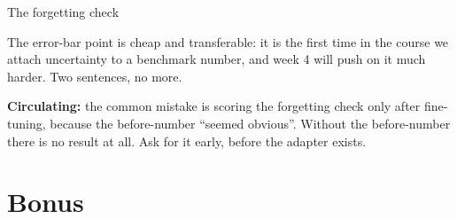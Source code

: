 \documentclass[aspectratio=169,10pt]{beamer}
\begin{document}
\begin{frame}[shrink=11]{The forgetting check}
{  The error-bar point is cheap and transferable: it is the first time in the
  course we attach uncertainty to a benchmark number, and week 4 will push on it
  much harder. Two sentences, no more.

  \textbf{Circulating:} the common mistake is scoring the forgetting check only
  after fine-tuning, because the before-number ``seemed obvious''. Without the
  before-number there is no result at all. Ask for it early, before the adapter
  exists.}
\end{frame}

\section{Bonus}
\end{document}
